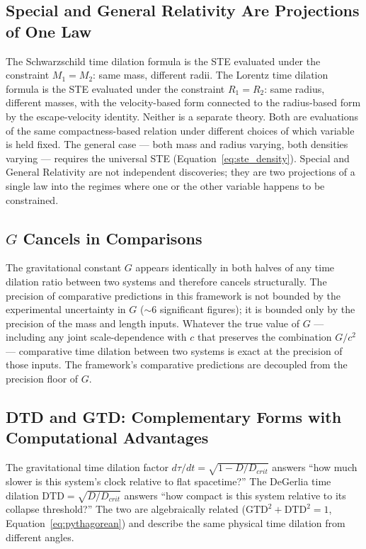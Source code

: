 \documentclass[twoside,twocolumn,9pt]{article}
\begin{document}
\subsection{Special and General Relativity Are Projections of One Law}

The Schwarzschild time dilation formula is the STE evaluated under the constraint $M_1 = M_2$: same mass, different radii. The Lorentz time dilation formula is the STE evaluated under the constraint $R_1 = R_2$: same radius, different masses, with the velocity-based form connected to the radius-based form by the escape-velocity identity. Neither is a separate theory. Both are evaluations of the same compactness-based relation under different choices of which variable is held fixed. The general case --- both mass and radius varying, both densities varying --- requires the universal STE (Equation~\ref{eq:ste_density}). Special and General Relativity are not independent discoveries; they are two projections of a single law into the regimes where one or the other variable happens to be constrained.

\subsection{$G$ Cancels in Comparisons}

The gravitational constant $G$ appears identically in both halves of any time dilation ratio between two systems and therefore cancels structurally. The precision of comparative predictions in this framework is not bounded by the experimental uncertainty in $G$ ($\sim 6$ significant figures); it is bounded only by the precision of the mass and length inputs. Whatever the true value of $G$ --- including any joint scale-dependence with $c$ that preserves the combination $G/c^2$ --- comparative time dilation between two systems is exact at the precision of those inputs. The framework's comparative predictions are decoupled from the precision floor of $G$.

\subsection{DTD and GTD: Complementary Forms with Computational Advantages}

The gravitational time dilation factor $d\tau/dt = \sqrt{1 - D/D_{crit}}$ answers ``how much slower is this system's clock relative to flat spacetime?'' The DeGerlia time dilation $\text{DTD} = \sqrt{D/D_{crit}}$ answers ``how compact is this system relative to its collapse threshold?'' The two are algebraically related ($\text{GTD}^2 + \text{DTD}^2 = 1$, Equation~\ref{eq:pythagorean}) and describe the same physical time dilation from different angles.
\end{document}
